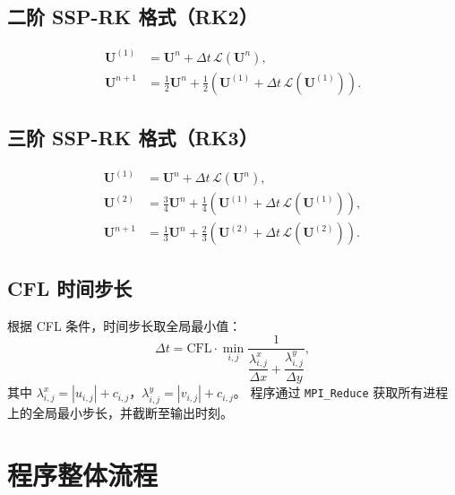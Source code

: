 \documentclass{article}
\numberwithin{equation}{section}
\begin{document}
\subsection{二阶 SSP-RK 格式（RK2）}
\begin{subequations}
\begin{align}
    \mathbf{U}^{(1)} &= \mathbf{U}^n + \Delta t\, \mathcal{L}(\mathbf{U}^n), \\
    \mathbf{U}^{n+1} &= \frac{1}{2}\mathbf{U}^n + \frac{1}{2}\left(\mathbf{U}^{(1)} + \Delta t\, \mathcal{L}(\mathbf{U}^{(1)})\right).
\end{align}
\end{subequations}

\subsection{三阶 SSP-RK 格式（RK3）}
\begin{subequations}
\begin{align}
    \mathbf{U}^{(1)} &= \mathbf{U}^n + \Delta t\, \mathcal{L}(\mathbf{U}^n), \\
    \mathbf{U}^{(2)} &= \frac{3}{4}\mathbf{U}^n + \frac{1}{4}\left(\mathbf{U}^{(1)} + \Delta t\, \mathcal{L}(\mathbf{U}^{(1)})\right), \\
    \mathbf{U}^{n+1} &= \frac{1}{3}\mathbf{U}^n + \frac{2}{3}\left(\mathbf{U}^{(2)} + \Delta t\, \mathcal{L}(\mathbf{U}^{(2)})\right).
\end{align}
\end{subequations}

\subsection{CFL 时间步长}

根据 CFL 条件，时间步长取全局最小值：
\begin{equation}
    \Delta t = \mathrm{CFL} \cdot \min_{i,j} \frac{1}{\dfrac{\lambda^x_{i,j}}{\Delta x} + \dfrac{\lambda^y_{i,j}}{\Delta y}},
\end{equation}
其中 $\lambda^x_{i,j} = |u_{i,j}| + c_{i,j}$，$\lambda^y_{i,j} = |v_{i,j}| + c_{i,j}$。
程序通过 \texttt{MPI\_Reduce} 获取所有进程上的全局最小步长，并截断至输出时刻。

\section{程序整体流程}
\end{document}
